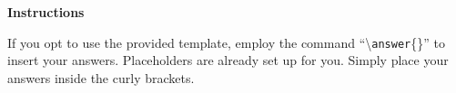
\item \textbf{\latex Instructions}

If you opt to use the provided \latex template, employ the command ``\textbackslash\texttt{answer}\{\}'' to insert your answers.
Placeholders are already set up for you.
Simply place your answers inside the curly brackets.